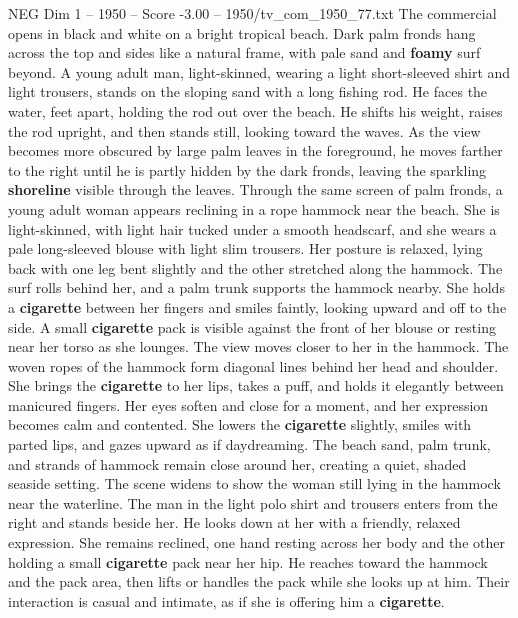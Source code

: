 \begin{textsample}{NEG Dim 1 – 1950 – Score -3.00 – 1950/tv\_com\_1950\_77.txt}  \label{ex:f1_neg_011}
The commercial opens in black and white on a bright tropical beach.
Dark palm fronds hang across the top and sides like a natural frame, with pale sand and \textbf{foamy} surf beyond.
A young adult man, light-skinned, wearing a light short-sleeved shirt and light trousers, stands on the sloping sand with a long fishing rod.
He faces the water, feet apart, holding the rod out over the beach.
He shifts his weight, raises the rod upright, and then stands still, looking toward the waves.
As the view becomes more obscured by large palm leaves in the foreground, he moves farther to the right until he is partly hidden by the dark fronds, leaving the sparkling \textbf{shoreline} visible through the leaves.
Through the same screen of palm fronds, a young adult woman appears reclining in a rope hammock near the beach.
She is light-skinned, with light hair tucked under a smooth headscarf, and she wears a pale long-sleeved blouse with light slim trousers.
Her posture is relaxed, lying back with one leg bent slightly and the other stretched along the hammock.
The surf rolls behind her, and a palm trunk supports the hammock nearby.
She holds a \textbf{cigarette} between her fingers and smiles faintly, looking upward and off to the side.
A small \textbf{cigarette} pack is visible against the front of her blouse or resting near her torso as she lounges.
The view moves closer to her in the hammock.
The woven ropes of the hammock form diagonal lines behind her head and shoulder.
She brings the \textbf{cigarette} to her lips, takes a puff, and holds it elegantly between manicured fingers.
Her eyes soften and close for a moment, and her expression becomes calm and contented.
She lowers the \textbf{cigarette} slightly, smiles with parted lips, and gazes upward as if daydreaming.
The beach sand, palm trunk, and strands of hammock remain close around her, creating a quiet, shaded seaside setting.
The scene widens to show the woman still lying in the hammock near the waterline.
The man in the light polo shirt and trousers enters from the right and stands beside her.
He looks down at her with a friendly, relaxed expression.
She remains reclined, one hand resting across her body and the other holding a small \textbf{cigarette} pack near her hip.
He reaches toward the hammock and the pack area, then lifts or handles the pack while she looks up at him.
Their interaction is casual and intimate, as if she is offering him a \textbf{cigarette}.

\end{textsample}
